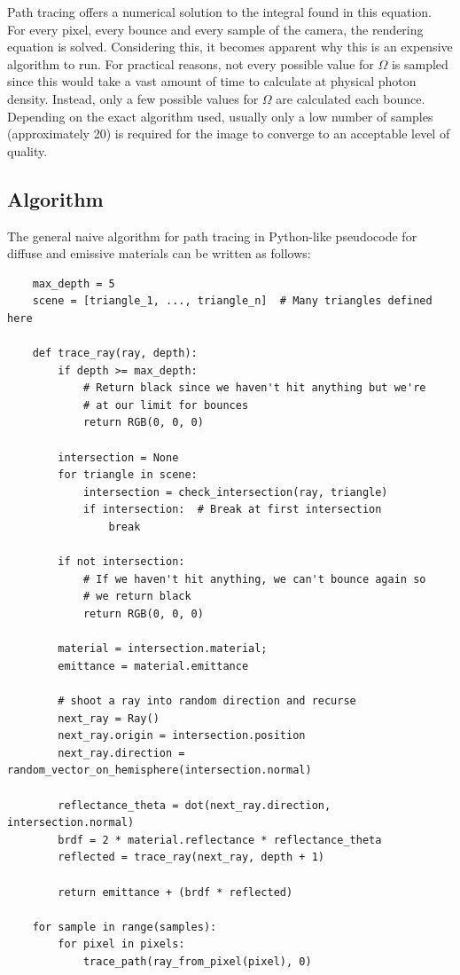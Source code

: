 \documentclass[
  twoside,
  11pt, a4paper,
  footinclude=true,
  headinclude=true,
  cleardoublepage=empty
]{scrreprt}
\begin{document}
Path tracing offers a numerical solution to the integral found in this equation. For every pixel,
every bounce and every sample of the camera, the rendering equation is solved. Considering this, it becomes apparent
why this is an expensive algorithm to run. For practical reasons, not every possible value for
\(\Omega\) is sampled since this would take a vast amount of time to calculate at physical photon
density. Instead, only a few possible values for \(\Omega\) are calculated each bounce. Depending
on the exact algorithm used, usually only a low number of samples (approximately 20) is required for the
image to converge to an acceptable level of quality.

\subsection{Algorithm}
\label{algorithm}
The general naive algorithm for path tracing in Python-like pseudocode for diffuse and
emissive materials can be written as follows:

\begin{verbatim}
    max_depth = 5
    scene = [triangle_1, ..., triangle_n]  # Many triangles defined here

    def trace_ray(ray, depth):
        if depth >= max_depth:
            # Return black since we haven't hit anything but we're
            # at our limit for bounces
            return RGB(0, 0, 0) 

        intersection = None
        for triangle in scene:
            intersection = check_intersection(ray, triangle)
            if intersection:  # Break at first intersection
                break

        if not intersection:
            # If we haven't hit anything, we can't bounce again so
            # we return black
            return RGB(0, 0, 0)

        material = intersection.material;
        emittance = material.emittance

        # shoot a ray into random direction and recurse
        next_ray = Ray()
        next_ray.origin = intersection.position
        next_ray.direction = random_vector_on_hemisphere(intersection.normal)

        reflectance_theta = dot(next_ray.direction, intersection.normal)
        brdf = 2 * material.reflectance * reflectance_theta
        reflected = trace_ray(next_ray, depth + 1)

        return emittance + (brdf * reflected)

    for sample in range(samples):
        for pixel in pixels:
            trace_path(ray_from_pixel(pixel), 0)
\end{verbatim}
\begingroup
{}
\endgroup
\end{document}
